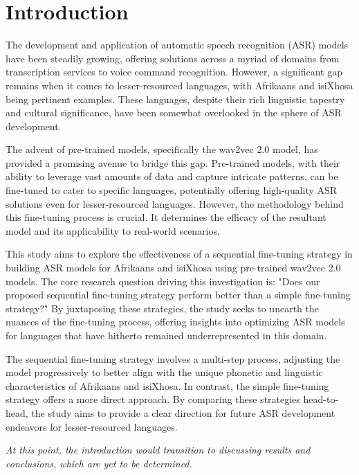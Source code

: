 \graphicspath{{introduction/fig/}}

\chapter{Introduction} \label{chap:introduction}
%
%
%
%
The development and application of automatic speech recognition (ASR) models have been steadily growing, 
offering solutions across a myriad of domains from transcription services to voice command recognition. 
However, a significant gap remains when it comes to lesser-resourced languages, with Afrikaans and isiXhosa 
being pertinent examples. These languages, despite their rich linguistic tapestry and cultural significance, 
have been somewhat overlooked in the sphere of ASR development.

The advent of pre-trained models, specifically the wav2vec 2.0 model, has provided a promising avenue to bridge this gap. 
Pre-trained models, with their ability to leverage vast amounts of data and capture intricate patterns, 
can be fine-tuned to cater to specific languages, potentially offering high-quality ASR solutions even for lesser-resourced languages. 
However, the methodology behind this fine-tuning process is crucial. It determines the efficacy of the resultant model and its applicability to real-world scenarios.

This study aims to explore the effectiveness of a sequential fine-tuning strategy in building ASR models 
for Afrikaans and isiXhosa using pre-trained wav2vec 2.0 models. The core research question driving this investigation is: 
"Does our proposed sequential fine-tuning strategy perform better than a simple fine-tuning strategy?" 
By juxtaposing these strategies, the study seeks to unearth the nuances of the fine-tuning process, 
offering insights into optimizing ASR models for languages that have hitherto remained underrepresented in this domain.

The sequential fine-tuning strategy involves a multi-step process, adjusting the model progressively to better 
align with the unique phonetic and linguistic characteristics of Afrikaans and isiXhosa. 
In contrast, the simple fine-tuning strategy offers a more direct approach. By comparing these strategies head-to-head, 
the study aims to provide a clear direction for future ASR development endeavors for lesser-resourced languages.

\textit{At this point, the introduction would transition to discussing results and conclusions, which are yet to be determined.}